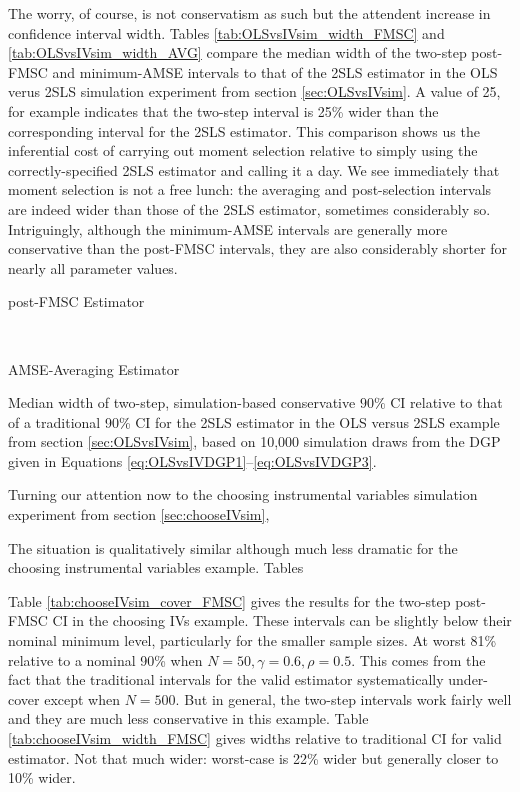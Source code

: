 The worry, of course, is not conservatism as such but the attendent increase in confidence interval width.
Tables \ref{tab:OLSvsIVsim_width_FMSC} and \ref{tab:OLSvsIVsim_width_AVG} compare the median width of the two-step post-FMSC and minimum-AMSE intervals to that of the 2SLS estimator in the OLS verus 2SLS simulation experiment from section \ref{sec:OLSvsIVsim}.
A value of 25, for example indicates that the two-step interval is 25\% wider than the corresponding interval for the 2SLS estimator.
This comparison shows us the inferential cost of carrying out moment selection relative to simply using the correctly-specified 2SLS estimator and calling it a day.
We see immediately that moment selection is not a free lunch: the averaging and post-selection intervals are indeed wider than those of the 2SLS estimator, sometimes considerably so.
Intriguingly, although the minimum-AMSE intervals are generally more conservative than the post-FMSC intervals, they are also considerably shorter for nearly all parameter values.
\begin{table}[h]
\footnotesize
\centering
	\begin{subtable}{0.48\textwidth}
		\caption{post-FMSC Estimator}
		
		\label{tab:OLSvsIVsim_width_FMSC}
	\end{subtable}	
	~
	\begin{subtable}{0.48\textwidth}
		\caption{AMSE-Averaging Estimator}
		
		\label{tab:OLSvsIVsim_width_AVG}
	\end{subtable}
	\caption{Median width of two-step, simulation-based conservative $90\%$ CI relative to that of a traditional 90\% CI for the 2SLS estimator in the OLS versus 2SLS example from section \ref{sec:OLSvsIVsim}, based on 10,000 simulation draws from the DGP given in Equations \ref{eq:OLSvsIVDGP1}--\ref{eq:OLSvsIVDGP3}.}
\end{table}

Turning our attention now to the choosing instrumental variables simulation experiment from section \ref{sec:chooseIVsim}, 




The situation is qualitatively similar although much less dramatic for the choosing instrumental variables example.
Tables 



Table \ref{tab:chooseIVsim_cover_FMSC} gives the results for the two-step post-FMSC CI in the choosing IVs example.
These intervals can be slightly below their nominal minimum level, particularly for the smaller sample sizes.
At worst 81\% relative to a nominal 90\% when $N=50, \gamma = 0.6, \rho = 0.5$. 
This comes from the fact that the traditional intervals for the valid estimator systematically under-cover except when $N = 500$.
But in general, the two-step intervals work fairly well and they are much less conservative in this example.
Table \ref{tab:chooseIVsim_width_FMSC} gives widths relative to traditional CI for valid estimator.
Not that much wider: worst-case is 22\% wider but generally closer to 10\% wider.


